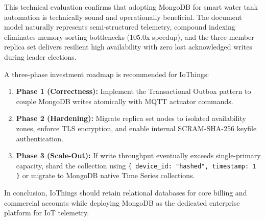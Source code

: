 \documentclass[11pt,a4paper]{article}
\begin{document}
This technical evaluation confirms that adopting MongoDB for smart water tank automation is technically sound and operationally beneficial. The document model naturally represents semi-structured telemetry, compound indexing eliminates memory-sorting bottlenecks (105.0x speedup), and the three-member replica set delivers resilient high availability with zero lost acknowledged writes during leader elections.

A three-phase investment roadmap is recommended for IoThings:
\begin{enumerate}[noitemsep]
\item \textbf{Phase 1 (Correctness):} Implement the Transactional Outbox pattern to couple MongoDB writes atomically with MQTT actuator commands.
\item \textbf{Phase 2 (Hardening):} Migrate replica set nodes to isolated availability zones, enforce TLS encryption, and enable internal SCRAM-SHA-256 keyfile authentication.
\item \textbf{Phase 3 (Scale-Out):} If write throughput eventually exceeds single-primary capacity, shard the collection using \texttt{\{ device\_id: "hashed", timestamp: 1 \}} or migrate to MongoDB native Time Series collections.
\end{enumerate}

In conclusion, IoThings should retain relational databases for core billing and commercial accounts while deploying MongoDB as the dedicated enterprise platform for IoT telemetry.
\end{document}
